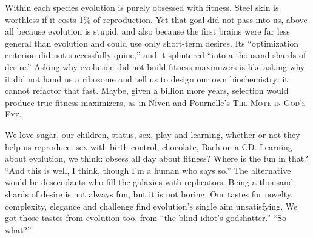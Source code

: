 Within each species evolution is purely obsessed with fitness. Steel skin is worthless if it costs 1\% of reproduction. Yet that goal did not pass into us, above all because evolution is stupid, and also because the first brains were far less general than evolution and could use only short-term desires. Its ``optimization criterion did not successfully quine,'' and it splintered ``into a thousand shards of desire.'' Asking why evolution did not build fitness maximizers is like asking why it did not hand us a ribosome and tell us to design our own biochemistry: it cannot refactor that fast. Maybe, given a billion more years, selection would produce true fitness maximizers, as in Niven and Pournelle's \textsc{The Mote in God's Eye}.

We love sugar, our children, status, sex, play and learning, whether or not they help us reproduce: sex with birth control, chocolate, Bach on a CD. Learning about evolution, we think: obsess all day about fitness? Where is the fun in that? ``And this is well, I think, though I'm a human who says so.'' The alternative would be descendants who fill the galaxies with replicators. Being a thousand shards of desire is not always fun, but it is not boring. Our tastes for novelty, complexity, elegance and challenge find evolution's single aim unsatisfying. We got those tastes from evolution too, from ``the blind idiot's godshatter.''  ``So what?'' 
